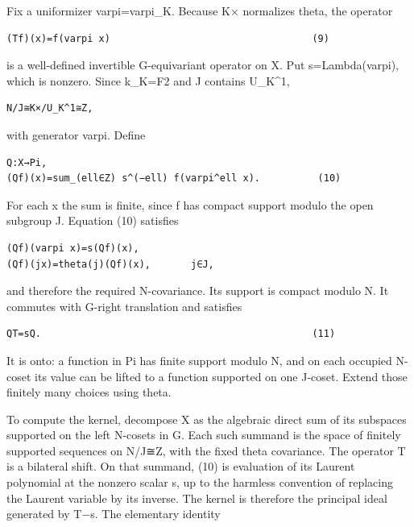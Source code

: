 Fix a uniformizer varpi=varpi\_K. Because K× normalizes theta, the
operator

\begin{Verbatim}[fontsize=\small,breaklines=true,breakanywhere=true]
(Tf)(x)=f(varpi x)                                   (9)
\end{Verbatim}

is a well-defined invertible G-equivariant operator on X. Put
s=Lambda(varpi), which is nonzero. Since k\_K=F2 and J contains
U\_K\^{}1,

\begin{Verbatim}[fontsize=\small,breaklines=true,breakanywhere=true]
N/J≅K×/U_K^1≅Z,
\end{Verbatim}

with generator varpi. Define

\begin{Verbatim}[fontsize=\small,breaklines=true,breakanywhere=true]
Q:X→Pi,
(Qf)(x)=sum_(ell∈Z) s^(−ell) f(varpi^ell x).          (10)
\end{Verbatim}

For each x the sum is finite, since f has compact support modulo the
open subgroup J. Equation (10) satisfies

\begin{Verbatim}[fontsize=\small,breaklines=true,breakanywhere=true]
(Qf)(varpi x)=s(Qf)(x),
(Qf)(jx)=theta(j)(Qf)(x),       j∈J,
\end{Verbatim}

and therefore the required N-covariance. Its support is compact modulo
N. It commutes with G-right translation and satisfies

\begin{Verbatim}[fontsize=\small,breaklines=true,breakanywhere=true]
QT=sQ.                                               (11)
\end{Verbatim}

It is onto: a function in Pi has finite support modulo N, and on each
occupied N-coset its value can be lifted to a function supported on one
J-coset. Extend those finitely many choices using theta.

To compute the kernel, decompose X as the algebraic direct sum of its
subspaces supported on the left N-cosets in G. Each such summand is the
space of finitely supported sequences on N/J≅Z, with the fixed theta
covariance. The operator T is a bilateral shift. On that summand, (10)
is evaluation of its Laurent polynomial at the nonzero scalar s, up to
the harmless convention of replacing the Laurent variable by its
inverse. The kernel is therefore the principal ideal generated by T−s.
The elementary identity

